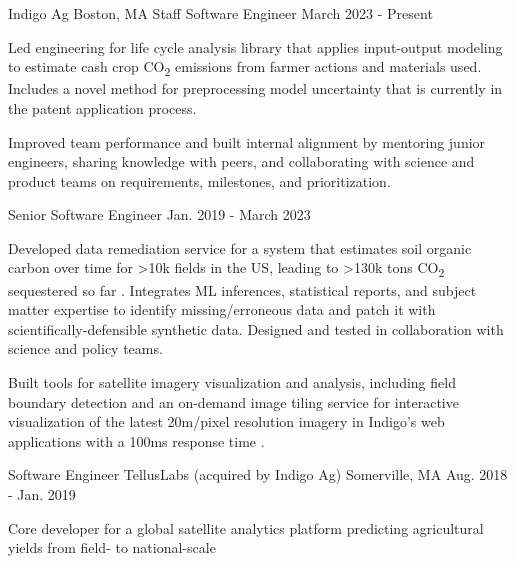 \documentclass[11pt, a4paper]{awesome-cv}
\begin{document}
\begin{cventries}

  \cventrydouble
    {Indigo Ag}  %
    {Boston, MA}  %
    {Staff Software Engineer}  %
    {March 2023 - Present}  %
    {
    \begin{cvitems}
      \item Led engineering for life cycle analysis library that applies input-output modeling to estimate cash crop CO\textsubscript{2} emissions from farmer actions and materials used. Includes a novel method for preprocessing model uncertainty that is currently in the patent application process.
      \item Improved team performance and built internal alignment by mentoring junior engineers, sharing knowledge with peers, and collaborating with science and product teams on requirements, milestones, and prioritization.
    \end{cvitems}
    }
    {Senior Software Engineer}  %
    {Jan. 2019 - March 2023}  %
    {
    \begin{cvitems}
      \item Developed data remediation service for a system that estimates soil organic carbon over time for >10k fields in the US, leading to >130k tons CO\textsubscript{2} sequestered so far . Integrates ML inferences, statistical reports, and subject matter expertise to identify missing/erroneous data and patch it with scientifically-defensible synthetic data. Designed and tested in collaboration with science and policy teams.
      \item Built tools for satellite imagery visualization and analysis, including field boundary detection  and an on-demand image tiling service for interactive visualization of the latest 20m/pixel resolution imagery in Indigo’s web applications with a 100ms response time .
    \end{cvitems}
    }

  \cventrytight
    {Software Engineer}
    {TellusLabs (acquired by Indigo Ag)}
    {Somerville, MA}
    {Aug. 2018 - Jan. 2019}
    {
    \begin{cvitems}
      \item Core developer for a global satellite analytics platform predicting agricultural yields from field- to national-scale
    \end{cvitems}
    }


\end{cventries}
\end{document}
